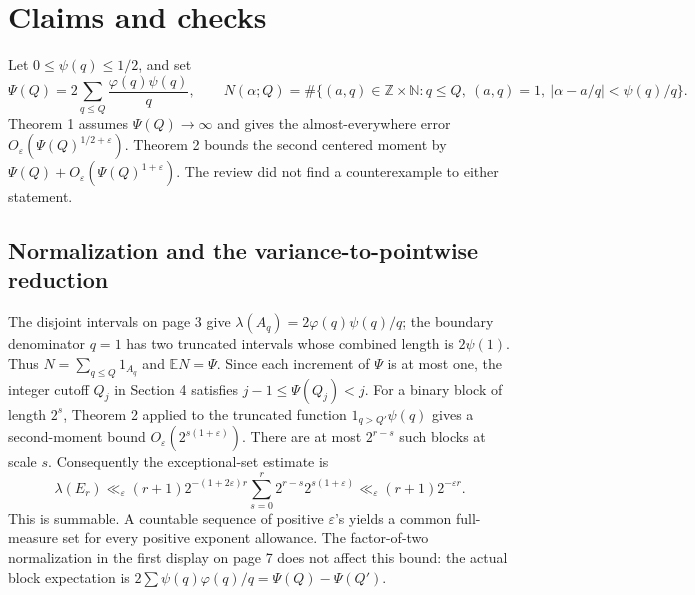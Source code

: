 \documentclass[10pt]{article}
\begin{document}
\section*{Claims and checks}
Let \(0\leq\psi(q)\leq 1/2\), and set \[\Psi(Q)=2\sum_{q\leq Q}\frac{\varphi(q)\psi(q)}q,\qquad
 N(\alpha;Q)=\#\{(a,q)\in\mathbb Z\times\mathbb N:
 q\leq Q,\ (a,q)=1,\ |\alpha-a/q|<\psi(q)/q\}.\] Theorem 1 assumes \(\Psi(Q)\to\infty\) and gives the almost-everywhere error \(O_\varepsilon(\Psi(Q)^{1/2+\varepsilon})\). Theorem 2 bounds the second centered moment by \(\Psi(Q)+O_\varepsilon(\Psi(Q)^{1+\varepsilon})\). The review did not find a counterexample to either statement.\par
\subsection*{Normalization and the variance-to-pointwise reduction}
The disjoint intervals on page 3 give \(\lambda(A_q)=2\varphi(q)\psi(q)/q\); the boundary denominator \(q=1\) has two truncated intervals whose combined length is \(2\psi(1)\). Thus \(N=\sum_{q\le Q}1_{A_q}\) and \(\mathbb EN=\Psi\). Since each increment of \(\Psi\) is at most one, the integer cutoff \(Q_j\) in Section 4 satisfies \(j-1\leq\Psi(Q_j)<j\). For a binary block of length \(2^s\), Theorem 2 applied to the truncated function \(1_{q>Q'}\psi(q)\) gives a second-moment bound \(O_\varepsilon(2^{s(1+\varepsilon)})\). There are at most \(2^{r-s}\) such blocks at scale \(s\). Consequently the exceptional-set estimate is \[\lambda(E_r)\ll_\varepsilon
 (r+1)2^{-(1+2\varepsilon)r}
 \sum_{s=0}^r 2^{r-s}2^{s(1+\varepsilon)}
 \ll_\varepsilon(r+1)2^{-\varepsilon r}.\] This is summable. A countable sequence of positive \(\varepsilon\)’s yields a common full-measure set for every positive exponent allowance. The factor-of-two normalization in the first display on page 7 does not affect this bound: the actual block expectation is \(2\sum\psi(q)\varphi(q)/q=\Psi(Q)-\Psi(Q')\).\par
\end{document}
